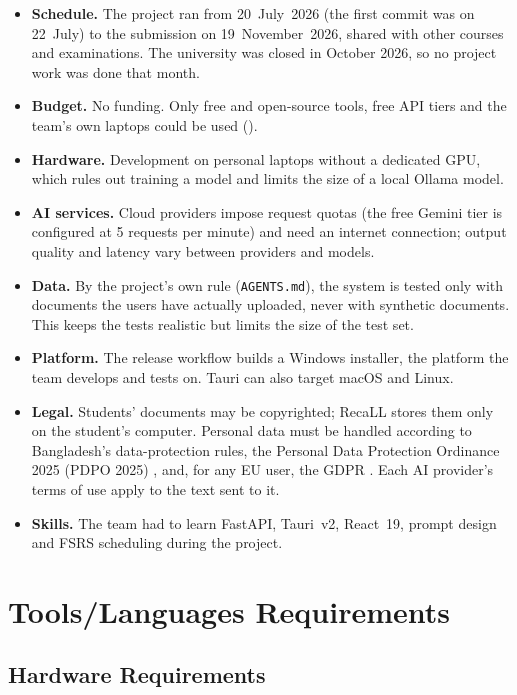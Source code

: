 \begin{itemize}
  \item \textbf{Schedule.} The project ran from 20~July~2026 (the first commit was on
  22~July) to the submission on 19~November~2026, shared with other courses and
  examinations. The university was closed in October 2026, so no project work was done
  that month.
  \item \textbf{Budget.} No funding. Only free and open-source tools, free API tiers and the
  team's own laptops could be used ().
  \item \textbf{Hardware.} Development on personal laptops without a dedicated GPU, which
  rules out training a model and limits the size of a local Ollama model.
  \item \textbf{AI services.} Cloud providers impose request quotas (the free Gemini tier is
  configured at 5 requests per minute) and need an internet connection; output quality and
  latency vary between providers and models.
  \item \textbf{Data.} By the project's own rule (\texttt{AGENTS.md}), the system is tested
  only with documents the users have actually uploaded, never with synthetic documents. This
  keeps the tests realistic but limits the size of the test set.
  \item \textbf{Platform.} The release workflow builds a Windows installer, the platform the
  team develops and tests on. Tauri can also target macOS and Linux.
  \item \textbf{Legal.} Students' documents may be copyrighted; RecaLL stores them only on the
  student's computer. Personal data must be handled according to Bangladesh's data-protection
  rules, the Personal Data Protection Ordinance 2025 (PDPO 2025) \cite{pdpo2025}, and, for any EU user, the
  GDPR \cite{gdpr2016}. Each AI provider's terms of use apply to the text sent to it.
  \item \textbf{Skills.} The team had to learn FastAPI, Tauri~v2, React~19, prompt design and
  FSRS scheduling during the project.
\end{itemize}

\section{Tools/Languages Requirements}

\subsection{Hardware Requirements}

